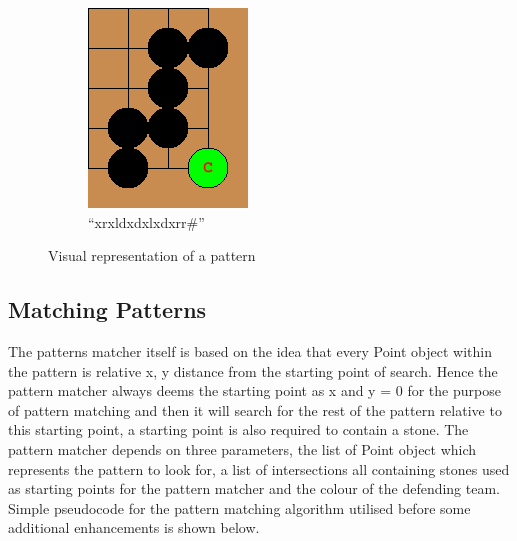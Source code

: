 \documentclass{l4proj}
\begin{document}
\begin{figure}[!ht]
\centering
\begin{subfigure}[b]{0.2\textwidth}
\includegraphics[width=\textwidth]{pat/1.png}
\caption{“xrxldxdxlxdxrr\#”}
\label{fig:pat-1a}
\end{subfigure}
\caption{Visual representation of a pattern}
\label{fig:pat-1}
\end{figure}

\subsection{Matching Patterns}

The patterns matcher itself is based on the idea that every Point object within the pattern is relative x, y distance from the starting point of search. Hence the pattern matcher always deems the starting point as x and y = 0 for the purpose of pattern matching and then it will search for the rest of the pattern relative to this starting point, a starting point is also required to contain a stone. The pattern matcher depends on three parameters, the list of Point object which represents the pattern to look for, a list of intersections all containing stones used as starting points for the pattern matcher and the colour of the defending team. Simple pseudocode for the pattern matching algorithm utilised before some additional enhancements is shown below.
\end{document}
